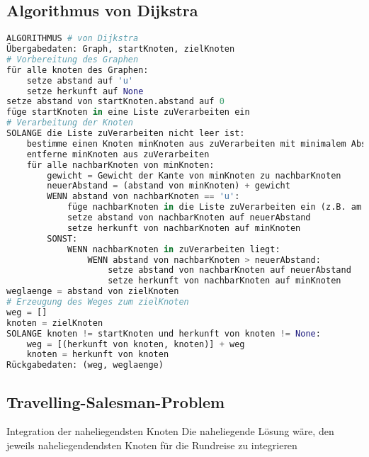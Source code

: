 \subsection{Algorithmus von Dijkstra}
\begin{lstlisting}[language=Python]
ALGORITHMUS # von Dijkstra
Übergabedaten: Graph, startKnoten, zielKnoten
# Vorbereitung des Graphen
für alle knoten des Graphen:
    setze abstand auf 'u'
    setze herkunft auf None
setze abstand von startKnoten.abstand auf 0
füge startKnoten in eine Liste zuVerarbeiten ein
# Verarbeitung der Knoten
SOLANGE die Liste zuVerarbeiten nicht leer ist:
    bestimme einen Knoten minKnoten aus zuVerarbeiten mit minimalem Abstand
    entferne minKnoten aus zuVerarbeiten
    für alle nachbarKnoten von minKnoten:
        gewicht = Gewicht der Kante von minKnoten zu nachbarKnoten
        neuerAbstand = (abstand von minKnoten) + gewicht
        WENN abstand von nachbarKnoten == 'u':
            füge nachbarKnoten in die Liste zuVerarbeiten ein (z.B. am Listenende)
            setze abstand von nachbarKnoten auf neuerAbstand
            setze herkunft von nachbarKnoten auf minKnoten
        SONST:
            WENN nachbarKnoten in zuVerarbeiten liegt:
                WENN abstand von nachbarKnoten > neuerAbstand:
                    setze abstand von nachbarKnoten auf neuerAbstand
                    setze herkunft von nachbarKnoten auf minKnoten
weglaenge = abstand von zielKnoten
# Erzeugung des Weges zum zielKnoten
weg = []
knoten = zielKnoten
SOLANGE knoten != startKnoten und herkunft von knoten != None:
    weg = [(herkunft von knoten, knoten)] + weg
    knoten = herkunft von knoten
Rückgabedaten: (weg, weglaenge)
\end{lstlisting}

\subsection{Travelling-Salesman-Problem}
\begin{zitat}{Integration der naheliegendsten Knoten}
Die naheliegende Lösung wäre, den jeweils naheliegendendsten Knoten für die Rundreise zu integrieren
\end{zitat}
